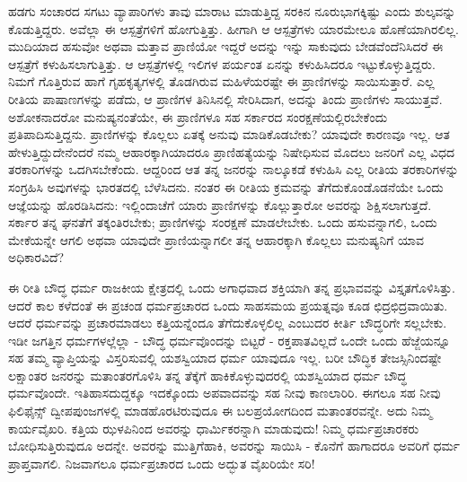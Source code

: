 ಹಡಗು ಸಂಚಾರದ ಸಗಟು ವ್ಯಾಪಾರಿಗಳು ತಾವು ಮಾರಾಟ ಮಾಡುತ್ತಿದ್ದ ಸರಕಿನ ನೂರುಭಾಗಕ್ಕಿಷ್ಟು ಎಂದು ಶುಲ್ಕವನ್ನು ಕೊಡುತ್ತಿದ್ದರು. ಅವೆಲ್ಲಾ ಈ ಆಸ್ಪತ್ರೆಗಳಿಗೆ ಹೋಗುತ್ತಿತ್ತು. ಹೀಗಾಗಿ ಆ ಆಸ್ಪತ್ರೆಗಳು ಯಾರಮೇಲೂ ಹೊಣೆಯಾಗಿರಲಿಲ್ಲ. ಮುದಿಯಾದ ಹಸುವೋ ಅಥವಾ ಮತ್ತಾವ ಪ್ರಾಣಿಯೋ ಇದ್ದರೆ ಅದನ್ನು ಇನ್ನು ಸಾಕುವುದು ಬೇಡವೆಂದೆನಿಸಿದರೆ ಈ ಆಸ್ಪತ್ರೆಗೆ ಕಳುಹಿಸಲಾಗುತ್ತಿತ್ತು. ಆ ಆಸ್ಪತ್ರೆಗಳಲ್ಲಿ ಇಲಿಗಳ ಪರ್ಯಂತ ಏನನ್ನು ಕಳುಹಿಸಿದರೂ ಇಟ್ಟುಕೊಳ್ಳುತ್ತಿದ್ದರು. ನಿಮಗೆ ಗೊತ್ತಿರುವ ಹಾಗೆ ಗೃಹಕೃತ್ಯಗಳಲ್ಲಿ ತೊಡಗಿರುವ ಮಹಿಳೆಯರಷ್ಟೇ ಈ ಪ್ರಾಣಿಗಳನ್ನು ಸಾಯಿಸುತ್ತಾರೆ. ಎಲ್ಲ ರೀತಿಯ ಪಾಷಾಣಗಳನ್ನು ಪಡೆದು, ಆ ಪ್ರಾಣಿಗಳ ತಿನಿಸಿನಲ್ಲಿ ಸೇರಿಸಿದಾಗ, ಅದನ್ನು ತಿಂದು ಪ್ರಾಣಿಗಳು ಸಾಯುತ್ತವೆ. ಅಶೋಕನಾದರೋ ಮನುಷ್ಯನಂತೆಯೇ, ಈ ಪ್ರಾಣಿಗಳೂ ಸಹ ಸರ್ಕಾರದ ಸಂರಕ್ಷಣೆಯಲ್ಲಿರಬೇಕೆಂದು ಪ್ರತಿಪಾದಿಸುತ್ತಿದ್ದನು. ಪ್ರಾಣಿಗಳನ್ನು ಕೊಲ್ಲಲು ಏತಕ್ಕೆ ಅನುವು ಮಾಡಿಕೊಡಬೇಕು? ಯಾವುದೇ ಕಾರಣವೂ ಇಲ್ಲ. ಆತ ಹೇಳುತ್ತಿದ್ದುದೇನೆಂದರೆ ನಮ್ಮ ಆಹಾರಕ್ಕಾಗಿಯಾದರೂ ಪ್ರಾಣಿಹತ್ಯೆಯನ್ನು ನಿಷೇಧಿಸುವ ಮೊದಲು ಜನರಿಗೆ ಎಲ್ಲ ವಿಧದ ತರಕಾರಿಗಳನ್ನು ಒದಗಿಸಬೇಕೆಂದು. ಆದ್ದರಿಂದ ಆತ ತನ್ನ ಜನರನ್ನು ನಾಲ್ಕೂಕಡೆ ಕಳುಹಿಸಿ ಎಲ್ಲ ರೀತಿಯ ತರಕಾರಿಗಳನ್ನು ಸಂಗ್ರಹಿಸಿ ಅವುಗಳನ್ನು ಭಾರತದಲ್ಲಿ ಬೆಳೆಸಿದನು. ನಂತರ ಈ ರೀತಿಯ ಕ್ರಮವನ್ನು ತೆಗೆದುಕೊಂಡೊಡನೆಯೇ ಒಂದು ಆಜ್ಞೆಯನ್ನು ಹೊರಡಿಸಿದನು: ಇಲ್ಲಿಂದಾಚೆಗೆ ಯಾರು ಪ್ರಾಣಿಗಳನ್ನು ಕೊಲ್ಲುತ್ತಾರೋ ಅವರನ್ನು ಶಿಕ್ಷಿಸಲಾಗುತ್ತದೆ. ಸರ್ಕಾರ ತನ್ನ ಘನತೆಗೆ ತಕ್ಕಂತಿರಬೇಕು; ಪ್ರಾಣಿಗಳನ್ನು ಸಂರಕ್ಷಣೆ ಮಾಡಲೇಬೇಕು. ಒಂದು ಹಸುವನ್ನಾಗಲಿ, ಒಂದು ಮೇಕೆಯನ್ನೇ ಆಗಲಿ ಅಥವಾ ಯಾವುದೇ ಪ್ರಾಣಿಯನ್ನಾಗಲೀ ತನ್ನ ಆಹಾರಕ್ಕಾಗಿ ಕೊಲ್ಲಲು ಮನುಷ್ಯನಿಗೆ ಯಾವ ಅಧಿಕಾರವಿದೆ?

ಈ ರೀತಿ ಬೌದ್ಧ ಧರ್ಮ ರಾಜಕೀಯ ಕ್ಷೇತ್ರದಲ್ಲಿ ಒಂದು ಅಗಾಧವಾದ ಶಕ್ತಿಯಾಗಿ ತನ್ನ ಪ್ರಭಾವವನ್ನು ವಿಸ್ತೃತಗೊಳಿಸಿತ್ತು. ಆದರೆ ಕಾಲ ಕಳೆದಂತೆ ಈ ಪ್ರಚಂಡ ಧರ್ಮಪ್ರಚಾರದ ಒಂದು ಸಾಹಸಮಯ ಪ್ರಯತ್ನವೂ ಕೂಡ ಛಿದ್ರಛಿದ್ರವಾಯಿತು. ಆದರೆ ಧರ್ಮವನ್ನು ಪ್ರಚಾರಮಾಡಲು ಕತ್ತಿಯನ್ನೆಂದೂ ತೆಗೆದುಕೊಳ್ಳಲಿಲ್ಲ ಎಂಬುದರ ಕೀರ್ತಿ ಬೌದ್ಧರಿಗೇ ಸಲ್ಲಬೇಕು. ಇಡೀ ಜಗತ್ತಿನ ಧರ್ಮಗಳಲ್ಲೆಲ್ಲಾ - ಬೌದ್ಧ ಧರ್ಮವೊಂದನ್ನು ಬಿಟ್ಟರೆ - ರಕ್ತಪಾತವಿಲ್ಲದೆ ಒಂದೇ ಒಂದು ಹೆಜ್ಜೆಯನ್ನೂ ಸಹ ತಮ್ಮ ವ್ಯಾಪ್ತಿಯನ್ನು ವಿಸ್ತರಿಸುವಲ್ಲಿ ಯಶಸ್ವಿಯಾದ ಧರ್ಮ ಯಾವುದೂ ಇಲ್ಲ. ಬರೀ ಬೌದ್ಧಿಕ ತೇಜಸ್ಸಿನಿಂದಷ್ಟೇ ಲಕ್ಷಾಂತರ ಜನರನ್ನು ಮತಾಂತರಗೊಳಿಸಿ ತನ್ನ ತೆಕ್ಕೆಗೆ ಹಾಕಿಕೊಳ್ಳುವುದರಲ್ಲಿ ಯಶಸ್ವಿಯಾದ ಧರ್ಮ ಬೌದ್ಧ ಧರ್ಮವೊಂದೇ. ಇತಿಹಾಸದುದ್ದಕ್ಕೂ ಇದಕ್ಕೊಂದು ಅಪವಾದವನ್ನು ಸಹ ನೀವು ಕಾಣಲಾರಿರಿ. ಈಗಲೂ ಸಹ ನೀವು ಫಿಲಿಫೈನ್ಸ್ ದ್ವೀಪಪುಂಜಗಳಲ್ಲಿ ಮಾಡಹೊರಟಿರುವುದೂ ಈ ಬಲಪ್ರಯೋಗದಿಂದ ಮತಾಂತರವನ್ನೇ. ಅದು ನಿಮ್ಮ ಕಾರ್ಯವೈಖರಿ. ಕತ್ತಿಯ ಝಳಪಿನಿಂದ ಅವರನ್ನು ಧಾರ್ಮಿಕರನ್ನಾಗಿ ಮಾಡುವುದು! ನಿಮ್ಮ ಧರ್ಮಪ್ರಚಾರಕರು ಬೋಧಿಸುತ್ತಿರುವುದೂ ಅದನ್ನೇ. ಅವರನ್ನು ಮುತ್ತಿಗೆಹಾಕಿ, ಅವರನ್ನು ಸಾಯಿಸಿ - ಕೊನೆಗೆ ಹಾಗಾದರೂ ಅವರಿಗೆ ಧರ್ಮ ಪ್ರಾಪ್ತವಾಗಲಿ. ನಿಜವಾಗಲೂ ಧರ್ಮಪ್ರಚಾರದ ಒಂದು ಅದ್ಭುತ ವೈಖರಿಯೇ ಸರಿ!

